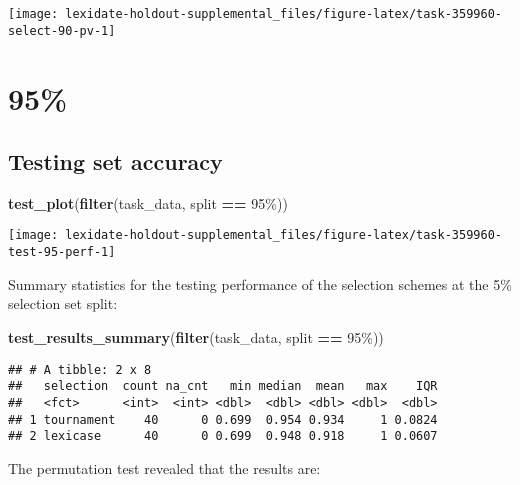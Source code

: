 \documentclass[
]{book}
\newenvironment{Shaded}{\begin{snugshade}}{\end{snugshade}}
\newcommand{\FunctionTok}[1]{\textcolor[rgb]{0.13,0.29,0.53}{\textbf{#1}}}
\newcommand{\NormalTok}[1]{#1}
\newcommand{\SpecialCharTok}[1]{\textcolor[rgb]{0.81,0.36,0.00}{\textbf{#1}}}
\newcommand{\StringTok}[1]{\textcolor[rgb]{0.31,0.60,0.02}{#1}}
\begin{document}
\texttt{[image: lexidate-holdout-supplemental\_files/figure-latex/task-359960-select-90-pv-1]}

\hypertarget{section-49}{%
\section{95\%}\label{section-49}}

\hypertarget{testing-set-accuracy-49}{%
\subsection{Testing set accuracy}\label{testing-set-accuracy-49}}

\begin{Shaded}
\begin{Highlighting}[]
\FunctionTok{test\_plot}\NormalTok{(}\FunctionTok{filter}\NormalTok{(task\_data, split }\SpecialCharTok{==} \StringTok{\textquotesingle{}95\%\textquotesingle{}}\NormalTok{))}
\end{Highlighting}
\end{Shaded}

\texttt{[image: lexidate-holdout-supplemental\_files/figure-latex/task-359960-test-95-perf-1]}

Summary statistics for the testing performance of the selection schemes at the 5\% selection set split:

\begin{Shaded}
\begin{Highlighting}[]
\FunctionTok{test\_results\_summary}\NormalTok{(}\FunctionTok{filter}\NormalTok{(task\_data, split }\SpecialCharTok{==} \StringTok{\textquotesingle{}95\%\textquotesingle{}}\NormalTok{))}
\end{Highlighting}
\end{Shaded}

\begin{verbatim}
## # A tibble: 2 x 8
##   selection  count na_cnt   min median  mean   max    IQR
##   <fct>      <int>  <int> <dbl>  <dbl> <dbl> <dbl>  <dbl>
## 1 tournament    40      0 0.699  0.954 0.934     1 0.0824
## 2 lexicase      40      0 0.699  0.948 0.918     1 0.0607
\end{verbatim}

The permutation test revealed that the results are:
\end{document}
